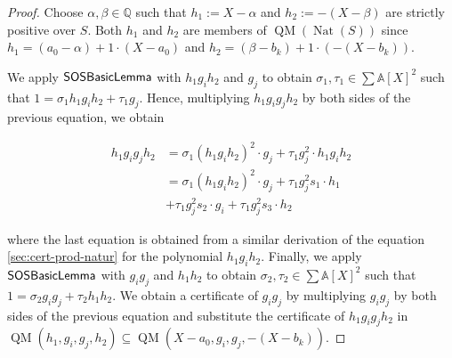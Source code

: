 \documentclass[preprint,12pt,authoryear]{elsarticle}
\newtheorem{proof}[theorem]{Proof}
\newcommand{\aX}{\mathbb{A}[X]}
\DeclareMathOperator{\quadmod}{QM}
\DeclareMathOperator{\algSOSBasicLemma}{\sf SOSBasicLemma}
\DeclareMathOperator{\Nat}{Nat}
\begin{document}
\begin{proof}
  Choose $\alpha, \beta \in \mathbb{Q}$ such that $h_1 := X - \alpha$ and
  $h_2 := -(X - \beta)$ are strictly positive over $S$. Both $h_1$ and $h_2$ are
  members of $\quadmod(\Nat(S))$ since
  $h_1 = (a_0 - \alpha) + 1 \cdot (X - a_0)$ and
  $h_2 = (\beta - b_k) + 1 \cdot (-(X - b_k))$.

  We apply $\algSOSBasicLemma$ with $h_1g_ih_2$ and $g_j$ to obtain
  $\sigma_1, \tau_1 \in \sum{\aX}^{2}$ such that
  $1 = \sigma_1 h_1g_ih_2 + \tau_1 g_j$. Hence, multiplying $h_1 g_i g_j h_2$ by
 both sides of the previous equation, we obtain

  \begin{equation} 
    \label{sec:cert-prod-natur-2}
    \begin{split}
      h_1g_ig_jh_2
      &= \sigma_1 (h_1 g_i h_2)^{2} \cdot g_j
        + \tau_1 g_j^{2} \cdot h_1 g_i h_2\\
      &= \sigma_1 (h_1 g_i h_2)^{2} \cdot g_j
        + \tau_1 g_j^{2} s_1 \cdot h_1\\
      &+ \tau_1 g_j^{2} s_2 \cdot g_i
        + \tau_1 g_j^{2} s_3 \cdot h_2
    \end{split}
  \end{equation}

  where the last equation is obtained from a similar derivation of the equation
 \eqref{sec:cert-prod-natur} for the polynomial $h_1g_ih_2$. Finally, we apply
  $\algSOSBasicLemma$ with $g_ig_j$ and $h_1h_2$ to obtain
  $\sigma_2, \tau_2 \in \sum{\aX}^{2}$ such that
  $1 = \sigma_2 g_ig_j + \tau_2 h_1 h_2$. We obtain a certificate of $g_ig_j$ by
  multiplying $g_ig_j$ by both sides of the previous equation and substitute the
  certificate of $h_1g_ig_jh_2$ in
  $\quadmod(h_1, g_i, g_j, h_2) \subseteq \quadmod(X - a_0, g_i, g_j, -(X -
  b_k))$.
\end{proof}
\end{document}
